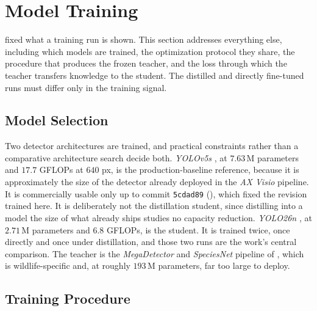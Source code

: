 \section{Model Training}\label{sec:model_training_experiment_tracking}

 fixed what a training run is shown. This section addresses everything else, including which models are trained, the optimization protocol they share, the procedure that produces the frozen teacher, and the loss through which the teacher transfers knowledge to the student. The distilled and directly fine-tuned runs must differ only in the training signal.

\subsection{Model Selection}\label{sec:model_selection}

Two detector architectures are trained, and practical constraints rather than a comparative architecture search decide both. \textit{YOLOv5s} \cite{ultralyticsComprehensiveGuideUltralytics}, at $7.63\,\mathrm{M}$ parameters and $17.7$ GFLOPs at $640$ px, is the production-baseline reference, because it is approximately the size of the detector already deployed in the \textit{AX Visio} pipeline. It is commercially usable only up to commit \texttt{5cdad89} (), which fixed the revision trained here. It is deliberately not the distillation student, since distilling into a model the size of what already ships studies no capacity reduction. \textit{YOLO26n} \cite{UltralyticsYOLO262025}, at $2.71\,\mathrm{M}$ parameters and $6.8$ GFLOPs, is the student. It is trained twice, once directly and once under distillation, and those two runs are the work's central comparison. The teacher is the \textit{MegaDetector} \cite{beeryEfficientPipelineCamera2019} and \textit{SpeciesNet} \cite{gadotCropNotCrop2024a} pipeline of , which is wildlife-specific and, at roughly $193\,\mathrm{M}$ parameters, far too large to deploy.  %

\subsection{Training Procedure}\label{sec:training_procedure}

